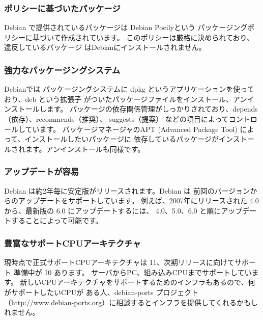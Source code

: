 \documentclass[mingoth,a4paper]{jsarticle}
\begin{document}

\subsubsection{ポリシーに基づいたパッケージ}
Debian で提供されているパッケージは Debian Pocilyという
パッケージングポリシーに基づいて作成されています。
このポリシーは厳格に決められており、違反しているパッケージ
はDebianにインストールされません。

\subsubsection{強力なパッケージングシステム}
Debianでは パッケージングシステムに dpkg というアプリケーションを使っており、deb という拡張子
がついたパッケージファイルをインストール、アンインストールします。
パッケージの依存関係管理がしっかりされており、depends（依存）、recommends（推奨）、
suggests（提案） などの項目によってコントロールしています。
パッケージマネージャのAPT (Advanced Package Tool) によって、インストールしたいパッケージに
依存しているパッケージがインストールされます。アンインストールも同様です。

\subsubsection{アップデートが容易}
Debian は約2年毎に安定版がリリースされます。Debian は
前回のバージョンからのアップデートをサポートしています。
例えば、2007年にリリースされた 4.0 から、最新版の 6.0 にアップデートするには、
4.0、5.0、6.0 と順にアップデートすることによって可能です。

\subsubsection{豊富なサポートCPUアーキテクチャ}
現時点で正式サポートCPUアーキテクチャは 11、次期リリースに向けてサポート
準備中が 10 あります。
サーバからPC、組み込みCPUまでサポートしています。
新しいCPUアーキテクチャをサポートするためのインフラもあるので、何がサポートしたいCPUが
ある人、debian-ports プロジェクト（http://www.debian-ports.org）に相談するとインフラを提供してくれるかもしれません。
\end{document}
